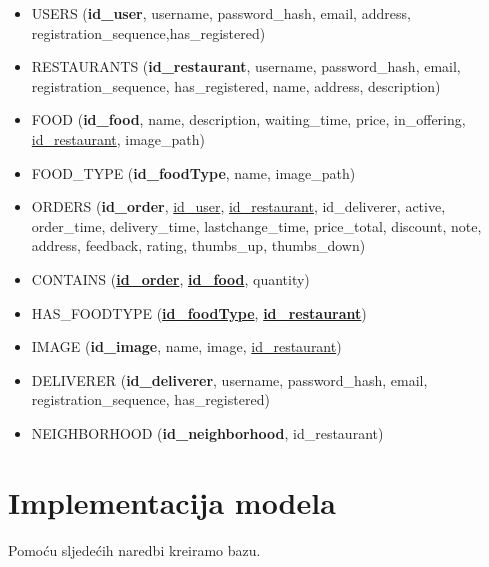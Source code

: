 \documentclass[12pt]{scrartcl}
\begin{document}
\begin{itemize}
    \item[] \textsf{USERS (\textbf{id\_user}, username, password\_hash, email, address,\\ registration\_sequence,has\_registered)}
    \item[] \textsf{RESTAURANTS (\textbf{id\_restaurant}, username, password\_hash, email, \\registration\_sequence, has\_registered, name, address, description)}
    \item[] \textsf{FOOD (\textbf{id\_food}, name, description, waiting\_time, price, in\_offering, \underline{id\_restaurant}, image\_path)}
    \item[] \textsf{FOOD\_TYPE (\textbf{id\_foodType}, name, image\_path)}
    \item[] \textsf{ORDERS (\textbf{id\_order}, \underline{id\_user}, \underline{id\_restaurant}, id\_deliverer, active, order\_time, delivery\_time, lastchange\_time, price\_total, discount, note, address, feedback, rating, thumbs\_up, thumbs\_down)}
    \item[] \textsf{CONTAINS (\textbf{\underline{id\_order}}, \textbf{\underline{id\_food}}, quantity)}
    \item[] \textsf{HAS\_FOODTYPE (\textbf{\underline{id\_foodType}}, \textbf{\underline{id\_restaurant}})}
    \item[] \textsf{IMAGE (\textbf{id\_image}, name, image, \underline{id\_restaurant})}
    \item[] \textsf{DELIVERER (\textbf{id\_deliverer}, username, password\_hash, email,\\ registration\_sequence, has\_registered)}
    \item[] \textsf{NEIGHBORHOOD (\textbf{id\_neighborhood}, id\_restaurant)}
\end{itemize}

\pagebreak[3]

\section{Implementacija modela}

Pomoću sljedećih naredbi kreiramo bazu.
\end{document}
